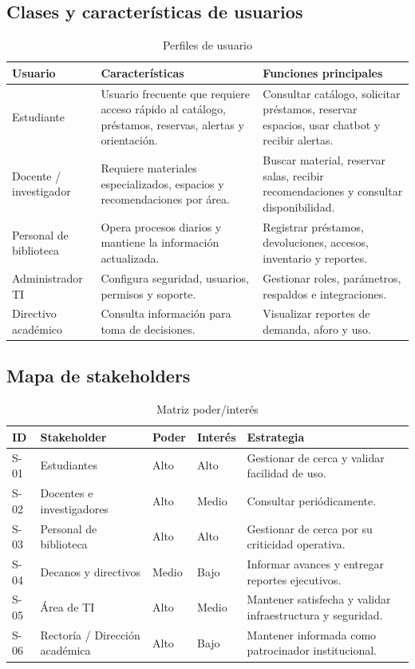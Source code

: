 \documentclass[12pt,journal,onecolumn]{IEEEtran}
\begin{document}
\subsection{Clases y características de usuarios}
\begin{table}[H]\centering
\caption{Perfiles de usuario}
\begin{tabularx}{\textwidth}{P{0.20\textwidth}Y Y}\toprule
\textbf{Usuario} & \textbf{Características} & \textbf{Funciones principales}\\\midrule
Estudiante & Usuario frecuente que requiere acceso rápido al catálogo, préstamos, reservas, alertas y orientación. & Consultar catálogo, solicitar préstamos, reservar espacios, usar chatbot y recibir alertas.\\
Docente / investigador & Requiere materiales especializados, espacios y recomendaciones por área. & Buscar material, reservar salas, recibir recomendaciones y consultar disponibilidad.\\
Personal de biblioteca & Opera procesos diarios y mantiene la información actualizada. & Registrar préstamos, devoluciones, accesos, inventario y reportes.\\
Administrador TI & Configura seguridad, usuarios, permisos y soporte. & Gestionar roles, parámetros, respaldos e integraciones.\\
Directivo académico & Consulta información para toma de decisiones. & Visualizar reportes de demanda, aforo y uso.\\\bottomrule
\end{tabularx}
\end{table}

\subsection{Mapa de stakeholders}
\begin{table}[H]\centering
\caption{Matriz poder/interés}
\begin{tabularx}{\textwidth}{P{0.10\textwidth}P{0.28\textwidth}P{0.12\textwidth}P{0.12\textwidth}Y}\toprule
\textbf{ID} & \textbf{Stakeholder} & \textbf{Poder} & \textbf{Interés} & \textbf{Estrategia}\\\midrule
S-01 & Estudiantes & Alto & Alto & Gestionar de cerca y validar facilidad de uso.\\
S-02 & Docentes e investigadores & Alto & Medio & Consultar periódicamente.\\
S-03 & Personal de biblioteca & Alto & Alto & Gestionar de cerca por su criticidad operativa.\\
S-04 & Decanos y directivos & Medio & Bajo & Informar avances y entregar reportes ejecutivos.\\
S-05 & Área de TI & Alto & Medio & Mantener satisfecha y validar infraestructura y seguridad.\\
S-06 & Rectoría / Dirección académica & Alto & Bajo & Mantener informada como patrocinador institucional.\\\bottomrule
\end{tabularx}
\end{table}
\end{document}
